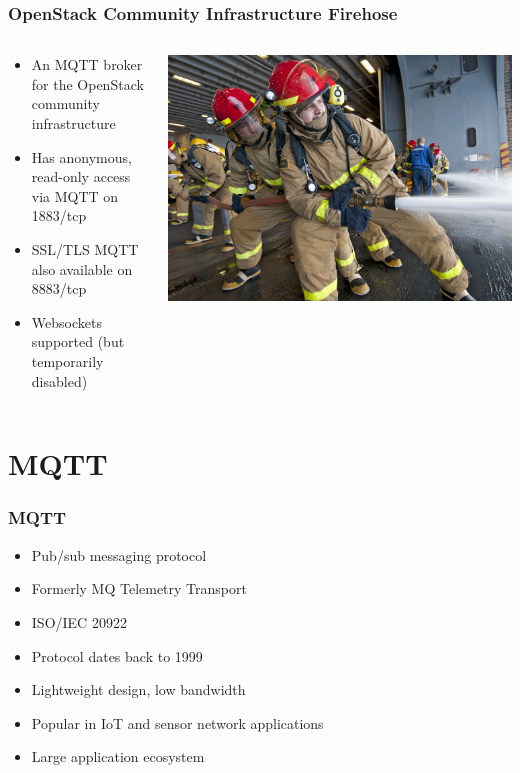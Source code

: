 \documentclass[aspectratio=169,11pt,hyperref={colorlinks=true}]{beamer}
\begin{document}
\begin{frame}
	\frametitle{OpenStack Community Infrastructure Firehose}
    \begin{columns}[T]
        \begin{column}{.48\textwidth}
            \begin{itemize}
                \item An MQTT broker for the OpenStack community infrastructure
                \item Has anonymous, read-only access via MQTT on 1883/tcp
                \item SSL/TLS MQTT also available on 8883/tcp
                \item Websockets supported (but temporarily disabled)
            \end{itemize}
        \end{column}
        \begin{column}{.48\textwidth}
            \includegraphics[width=\textwidth]{firehose.jpg}
        \end{column}
    \end{columns}
\end{frame}

\section{MQTT}
\begin{frame}
	\frametitle{MQTT}
    \begin{itemize}
        \item Pub/sub messaging protocol
        \item Formerly MQ Telemetry Transport
        \item ISO/IEC 20922
        \item Protocol dates back to 1999
        \item Lightweight design, low bandwidth
        \item Popular in IoT and sensor network applications
        \item Large application ecosystem
    \end{itemize}
\end{frame}
\end{document}
